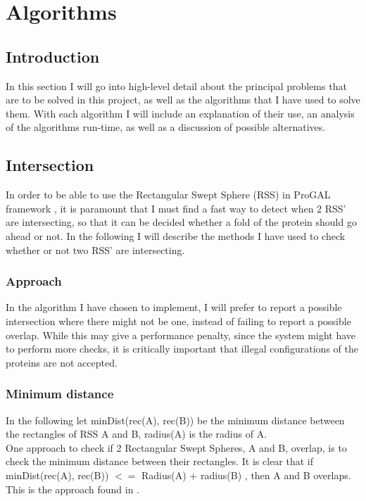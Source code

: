 
\section{Algorithms}
\label{algorithms}
\subsection{Introduction}
In this section I will go into high-level detail about the principal problems that are to be solved in this project, as well as the algorithms that I have used to solve them. With each algorithm I will include an explanation of their use, an analysis of the algorithms run-time, as well as a discussion of possible alternatives. 

\subsection{Intersection}
In order to be able to use the Rectangular Swept Sphere (RSS) in ProGAL framework , it is paramount that I must find a fast way to detect when 2 RSS' are intersecting, so that it can be decided whether a fold of the protein should go ahead or not. In the following I will describe the methods I have used to check whether or not two RSS' are intersecting.

\subsubsection{Approach}
In the algorithm I have chosen to implement, I will prefer to report a possible intersection where there might not be one, instead of failing to report a possible overlap. While this may give a performance penalty, since the system might have to perform more checks, it is critically important that illegal configurations of the proteins are not accepted. 

\subsubsection{Minimum distance}
In the following let minDist(rec(A), rec(B)) be the minimum distance between the rectangles of RSS A and B, radius(A) is the radius of A.\\

One approach to check if 2 Rectangular Swept Spheres, A and B, overlap, is to check the minimum distance between their rectangles. It is clear that if minDist(rec(A), rec(B)) $<=$ Radius(A) + radius(B) , then A and B overlaps. This is the approach found in \cite{Larsen99fastproximity}.

